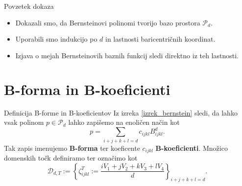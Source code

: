 \documentclass{beamer}
\begin{document}
\begin{frame}{Povzetek dokaza}
    \begin{itemize}
        \item Dokazali smo, da Bernsteinovi polinomi tvorijo bazo prostora $\mathcal{P}_d$.
        \item Uporabili smo indukcijo po $d$ in lastnosti baricentričnih koordinat.
        \item Izjava o mejah Bernsteinovih baznih funkcij sledi direktno iz teh lastnosti.
    \end{itemize}
\end{frame}

\section{B-forma in B-koeficienti}
\begin{frame}{Definicija B-forme in B-koeficientov}
Iz izreka \ref{izrek_bernstein} sledi, da lahko vsak polinom $p \in \mathcal{P}_d$
lahko zapišemo na enoličen način kot
\begin{equation}\label{eq_Bforma}
    p = \sum_{i+j+k+l = d} c_{ijkl} B_{ijkl}^d.
\end{equation}
Tak zapis imenujemo \textbf{B-forma} ter koeficente $c_{ijkl}$ \textbf{B-koeficienti}.
Množico domenskih točk definiramo ter označimo kot
\begin{equation}
    \mathcal{D}_{d,T} := 
    \left\{
        \zeta_{ijkl}^T:= \frac{i V_1 + j V_2 + k V_3 + l V_4}{d}
     \right\}_{i + j+ k+l = d}.
\end{equation}
\end{frame}
\end{document}

